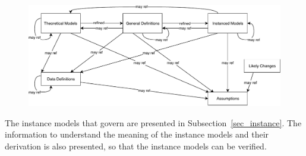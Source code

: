 \documentclass[12pt]{article}
\begin{document}




\begin{figure}[H]
  \includegraphics[scale=0.9]{RelationsBetweenTM_GD_IM_DD_A.pdf}
\end{figure}

The instance models that govern \progname{} are presented in
Subsection~\ref{sec_instance}.  The information to understand the meaning of the
instance models and their derivation is also presented, so that the instance
models can be verified.

\end{document}
